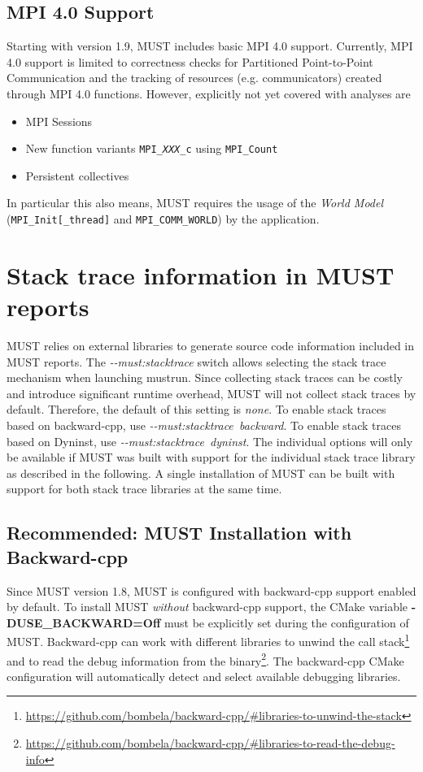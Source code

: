 \documentclass[english]{scrartcl}
\begin{document}
\subsection{MPI 4.0 Support}
Starting with version 1.9, MUST includes basic MPI 4.0 support.
Currently, MPI 4.0 support is limited to correctness checks for Partitioned Point-to-Point Communication and the tracking of resources (e.g. communicators) created through MPI 4.0 functions.
However, explicitly not yet covered with analyses are
\begin{itemize}
    \item MPI Sessions
    \item New function variants \texttt{MPI\_\textit{XXX}\_c} using \texttt{MPI\_Count}
    \item Persistent collectives
\end{itemize}
In particular this also means, MUST requires the usage of the \textit{World Model} (\texttt{MPI\_Init[\_thread]} and \texttt{MPI\_COMM\_WORLD}) by the application.

\section{Stack trace information in MUST reports}
\label{section:stacktrace}
MUST relies on external libraries to generate source code information included in MUST reports. The \emph{\mbox{-{}-must:stacktrace}} switch allows selecting the stack trace mechanism when launching mustrun. Since collecting stack traces can be costly and introduce significant runtime overhead, MUST will not collect stack traces by default. Therefore, the default of this setting is \emph{none}.
To enable stack traces based on backward-cpp, use \emph{\mbox{-{}-must:stacktrace backward}}. 
To enable stack traces based on Dyninst, use \emph{\mbox{-{}-must:stacktrace dyninst}}. 
The individual options will only be available if MUST was built with support for the individual stack trace library as described in the following.
A single installation of MUST can be built with support for both stack trace libraries at the same time.

\subsection{Recommended: MUST Installation with Backward-cpp}
\label{section:backward}
Since MUST version 1.8, MUST is configured with backward-cpp support enabled by default. To install MUST \textit{without} backward-cpp support, the CMake variable \textbf{\mbox{-DUSE\_BACKWARD=Off}} must be explicitly set during the configuration of MUST. Backward-cpp can work with different libraries to unwind the call stack\footnote{\url{https://github.com/bombela/backward-cpp/\#libraries-to-unwind-the-stack}} and to read the debug information from the binary\footnote{\url{https://github.com/bombela/backward-cpp/\#libraries-to-read-the-debug-info}}. The backward-cpp CMake configuration will automatically detect and select available debugging libraries.
\end{document}
